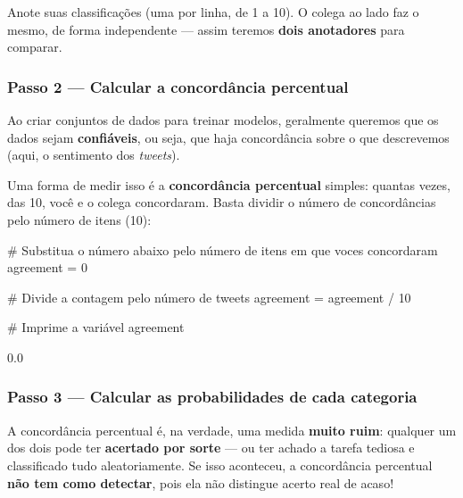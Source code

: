 \documentclass[
  brazilian,
  11pt,
]{article}
\newenvironment{Shaded}{\begin{snugshade}}{\end{snugshade}}
\newcommand{\CommentTok}[1]{\textcolor[rgb]{0.48,0.49,0.49}{#1}}
\newcommand{\DecValTok}[1]{\textcolor[rgb]{0.96,0.45,0.00}{#1}}
\newcommand{\NormalTok}[1]{\textcolor[rgb]{0.81,0.81,0.76}{#1}}
\newcommand{\OperatorTok}[1]{\textcolor[rgb]{0.81,0.81,0.76}{#1}}
\begin{document}
Anote suas classificações (uma por linha, de 1 a 10). O colega ao lado
faz o mesmo, de forma independente --- assim teremos \textbf{dois
anotadores} para comparar.

\subsubsection{Passo 2 --- Calcular a concordância
percentual}\label{passo-2-calcular-a-concorduxe2ncia-percentual}

Ao criar conjuntos de dados para treinar modelos, geralmente queremos
que os dados sejam \textbf{confiáveis}, ou seja, que haja concordância
sobre o que descrevemos (aqui, o sentimento dos \emph{tweets}).

Uma forma de medir isso é a \textbf{concordância percentual} simples:
quantas vezes, das 10, você e o colega concordaram. Basta dividir o
número de concordâncias pelo número de itens (10):

\begin{Shaded}
\begin{Highlighting}[]
\CommentTok{\# Substitua o número abaixo pelo número de itens em que voces concordaram}
\NormalTok{agreement }\OperatorTok{=} \DecValTok{0}

\CommentTok{\# Divide a contagem pelo número de tweets}
\NormalTok{agreement }\OperatorTok{=}\NormalTok{ agreement }\OperatorTok{/} \DecValTok{10}

\CommentTok{\# Imprime a variável}
\NormalTok{agreement}
\end{Highlighting}
\end{Shaded}

\begin{Shaded}
\begin{Highlighting}[]
\NormalTok{0.0}
\end{Highlighting}
\end{Shaded}

\subsubsection{Passo 3 --- Calcular as probabilidades de cada
categoria}\label{passo-3-calcular-as-probabilidades-de-cada-categoria}

A concordância percentual é, na verdade, uma medida \textbf{muito ruim}:
qualquer um dos dois pode ter \textbf{acertado por sorte} --- ou ter
achado a tarefa tediosa e classificado tudo aleatoriamente. Se isso
aconteceu, a concordância percentual \textbf{não tem como detectar},
pois ela não distingue acerto real de acaso!
\end{document}
